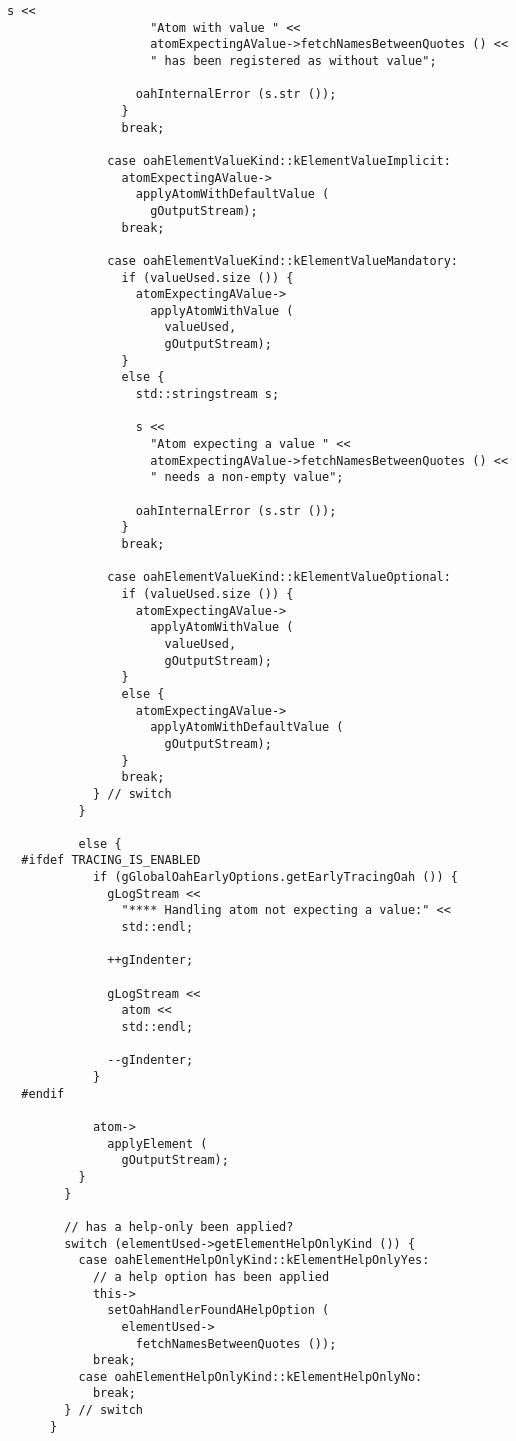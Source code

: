 {\begin{lstlisting}[language=CPlusPlus]
                  s <<
                    "Atom with value " <<
                    atomExpectingAValue->fetchNamesBetweenQuotes () <<
                    " has been registered as without value";

                  oahInternalError (s.str ());
                }
                break;

              case oahElementValueKind::kElementValueImplicit:
                atomExpectingAValue->
                  applyAtomWithDefaultValue (
                    gOutputStream);
                break;

              case oahElementValueKind::kElementValueMandatory:
                if (valueUsed.size ()) {
                  atomExpectingAValue->
                    applyAtomWithValue (
                      valueUsed,
                      gOutputStream);
                }
                else {
                  std::stringstream s;

                  s <<
                    "Atom expecting a value " <<
                    atomExpectingAValue->fetchNamesBetweenQuotes () <<
                    " needs a non-empty value";

                  oahInternalError (s.str ());
                }
                break;

              case oahElementValueKind::kElementValueOptional:
                if (valueUsed.size ()) {
                  atomExpectingAValue->
                    applyAtomWithValue (
                      valueUsed,
                      gOutputStream);
                }
                else {
                  atomExpectingAValue->
                    applyAtomWithDefaultValue (
                      gOutputStream);
                }
                break;
            } // switch
          }

          else {
  #ifdef TRACING_IS_ENABLED
            if (gGlobalOahEarlyOptions.getEarlyTracingOah ()) {
              gLogStream <<
                "**** Handling atom not expecting a value:" <<
                std::endl;

              ++gIndenter;

              gLogStream <<
                atom <<
                std::endl;

              --gIndenter;
            }
  #endif

            atom->
              applyElement (
                gOutputStream);
          }
        }

        // has a help-only been applied?
        switch (elementUsed->getElementHelpOnlyKind ()) {
          case oahElementHelpOnlyKind::kElementHelpOnlyYes:
            // a help option has been applied
            this->
              setOahHandlerFoundAHelpOption (
                elementUsed->
                  fetchNamesBetweenQuotes ());
            break;
          case oahElementHelpOnlyKind::kElementHelpOnlyNo:
            break;
        } // switch
      }


\end{lstlisting}}
